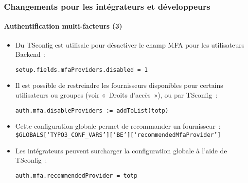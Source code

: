 %

\begin{frame}[fragile]
	\frametitle{Changements pour les intégrateurs et développeurs}
	\framesubtitle{Authentification multi-facteurs (3)}


	\begin{itemize}
		\item Du TSconfig est utilisale pour désactiver le champ MFA pour les utilisateurs Backend~:
\begin{lstlisting}
setup.fields.mfaProviders.disabled = 1
\end{lstlisting}

		\item Il est possible de restreindre les fournisseurs disponibles pour certains utilisateurs
			ou groupes (voir «~Droits d'accès~»), ou par TSconfig~:
\begin{lstlisting}
auth.mfa.disableProviders := addToList(totp)
\end{lstlisting}

		\item Cette configuration globale permet de recommander un fournisseur~:\newline
			\smaller\texttt{\$GLOBALS['TYPO3\_CONF\_VARS']['BE']['recommendedMfaProvider']}\normalsize

		\item Les intégrateurs peuvent surcharger la configuration globale à l'aide de TSconfig~:
\begin{lstlisting}
auth.mfa.recommendedProvider = totp
\end{lstlisting}

	\end{itemize}

\end{frame}

